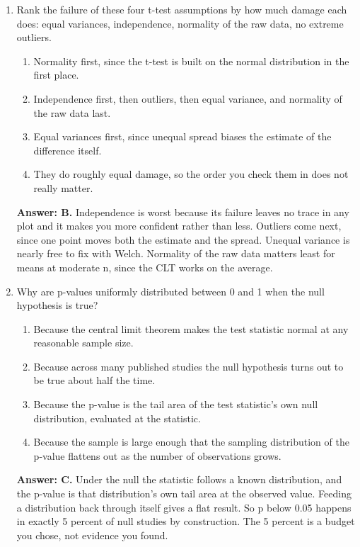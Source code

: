 \documentclass[11pt]{article}
\begin{document}
\begin{enumerate}[itemsep=14pt]
\item Rank the failure of these four t-test assumptions by how much damage each does: equal variances, independence, normality of the raw data, no extreme outliers.

\begin{enumerate}[label=\Alph*., itemsep=1pt, topsep=3pt]
  \item Normality first, since the t-test is built on the normal distribution in the first place.
  \item Independence first, then outliers, then equal variance, and normality of the raw data last.
  \item Equal variances first, since unequal spread biases the estimate of the difference itself.
  \item They do roughly equal damage, so the order you check them in does not really matter.
\end{enumerate}

\vspace{2pt}
\textbf{Answer: B.} Independence is worst because its failure leaves no trace in any plot and it makes you more confident rather than less. Outliers come next, since one point moves both the estimate and the spread. Unequal variance is nearly free to fix with Welch. Normality of the raw data matters least for means at moderate n, since the CLT works on the average.
\vspace{4pt}

\item Why are p-values uniformly distributed between 0 and 1 when the null hypothesis is true?

\begin{enumerate}[label=\Alph*., itemsep=1pt, topsep=3pt]
  \item Because the central limit theorem makes the test statistic normal at any reasonable sample size.
  \item Because across many published studies the null hypothesis turns out to be true about half the time.
  \item Because the p-value is the tail area of the test statistic's own null distribution, evaluated at the statistic.
  \item Because the sample is large enough that the sampling distribution of the p-value flattens out as the number of observations grows.
\end{enumerate}

\vspace{2pt}
\textbf{Answer: C.} Under the null the statistic follows a known distribution, and the p-value is that distribution's own tail area at the observed value. Feeding a distribution back through itself gives a flat result. So p below 0.05 happens in exactly 5 percent of null studies by construction. The 5 percent is a budget you chose, not evidence you found.
\vspace{4pt}


\end{enumerate}
\end{document}
